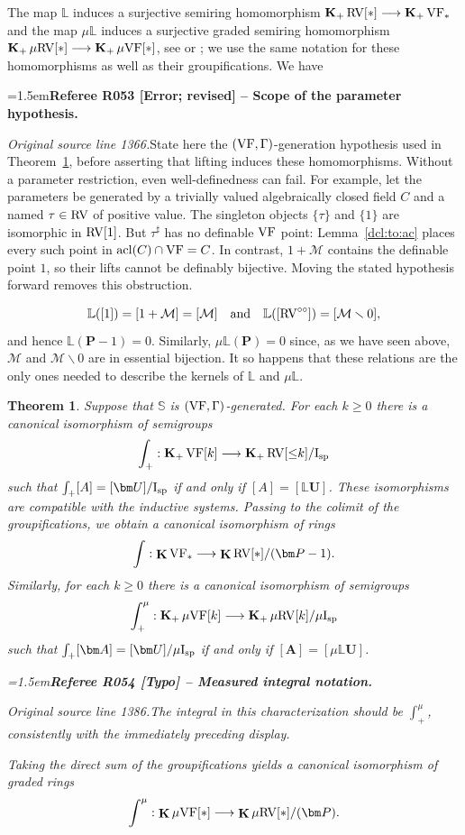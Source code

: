 \documentclass[12pt]{amsart}
\newcommand{\RefereeRemark}[4]{%
  \par\medskip\begingroup\normalfont\small\color{RefereePurple}%
  \emergencystretch=1.5em\noindent\textbf{Referee R#1 [#2] -- #3.}\par\nobreak\noindent #4\par
  \endgroup\medskip
}
\theoremstyle{plain}
\newtheorem{thm}{Theorem}[section]
\theoremstyle{definition}
\theoremstyle{remark}
\numberwithin{equation}{section}
\theoremstyle{plain}
\newcommand{\VF}{\textup{VF}}
\newcommand{\RV}{\textup{RV}}
\newcommand{\MM}{\mdl M}
\DeclareMathOperator{\acl}{acl}
\newcommand{\dand}{\quad \text{and} \quad}
\newcommand{\0}{\emptyset}
\newcommand{\mdl}[1]{\mathcal{#1}}  %
\newcommand{\bb}[1]{\mathbb{#1}}
\newcommand{\fun}{\longrightarrow}
\newcommand{\mi}{\smallsetminus}
\newcommand{\mgVF}{{\mu} {\VF}}
\newcommand{\mgRV}{{\mu}{\RV}}
\newcommand{\isp}{\textup{I}_{\textup{sp}}}
\newcommand{\mgisp}{\mu \isp}
\newcommand{\mgL}{{\mu}{\bb L}}
\DeclareMathOperator{\gsk}{\mathbf{K}_+}
\DeclareMathOperator{\ggk}{\mathbf{K}}
\begin{document}
The map $\bb L$ induces a surjective semiring homomorphism $\gsk \RV[*] \fun \gsk \VF_*$ and the map $\mgL$ induces a surjective graded semiring homomorphism $\gsk \mgRV[*] \fun \gsk \mgVF[*]$, see \cite[\S~4, \S~6]{hrushovski:kazhdan:integration:vf} or \cite[Corollaries~7.7, 10.6]{Yin:special:trans}; we use the same notation for these homomorphisms as well as their groupifications. We have

\RefereeRemark{053}{Error; revised}{Scope of the parameter hypothesis}{%
\textit{Original source line 1366.}\quad State here the $(\VF,\Gamma)$-generation hypothesis used in Theorem~\ref{main:prop:HK}, before asserting that lifting induces these homomorphisms. Without a parameter restriction, even well-definedness can fail. For example, let the parameters be generated by a trivially valued algebraically closed field $C$ and a named $\tau\in\RV$ of positive value. The singleton objects $\{\tau\}$ and $\{1\}$ are isomorphic in $\RV[1]$. But $\tau^\sharp$ has no definable $\VF$ point: Lemma~\ref{dcl:to:ac} places every such point in $\acl(C)\cap\VF=C$. In contrast, $1+\MM$ contains the definable point $1$, so their lifts cannot be definably bijective. Moving the stated hypothesis forward removes this obstruction.
}
\[
\bb L ([1]) = [1 + \MM] = [\MM] \dand \bb L ([\RV^{\circ\circ}])=[\MM \mi 0],
\]
and hence $\bb L (\bm P - 1)=0$. Similarly, $\mgL (\bm P)=0$ since, as we have seen above, $\MM$ and $\MM \mi 0$ are in essential bijection. It so happens that these relations are the only ones needed to describe the kernels of $\bb L$ and $\mgL$.


\begin{thm}\label{main:prop:HK}
Suppose that $\mathbb{S}$ is $(\VF, \Gamma)$-generated. For each $k \geq 0$ there is a canonical isomorphism of semigroups
\[
\int_{+} : \gsk  \VF[k] \fun \gsk  \RV[{\leq}k] /  \isp
\]
such that $ \int_{+} [A] = [\bm U]/  \isp$ if and only if $[A] = [{\bb L}{\bm U}]$. These isomorphisms are  compatible with the inductive systems. Passing to  the colimit of the groupifications, we obtain a canonical isomorphism of rings
\[
\int : \ggk \VF_* \fun \ggk  \RV[*] /  (\bm P - 1).
\]
Similarly, for each $k \geq 0$ there is a canonical isomorphism of semigroups
\[
\int_{+}^\mu : \gsk  \mgVF[k] \fun \gsk  \mgRV[k] /  \mgisp
\]
such that $\int_{+} [\bm A] = [\bm U]/  \mgisp$  if and only if $[\bm A] = [{\mgL}{\bm U}]$.

\RefereeRemark{054}{Typo}{Measured integral notation}{%
\textit{Original source line 1386.}\quad The integral in this characterization should be $\int_+^\mu$, consistently with the immediately preceding display.
}
Taking the direct sum of the groupifications yields a canonical isomorphism of graded rings
\[
\int^\mu : \ggk \mgVF[*] \fun \ggk  \mgRV[*] /  (\bm P).
\]
\end{thm}
\end{document}
